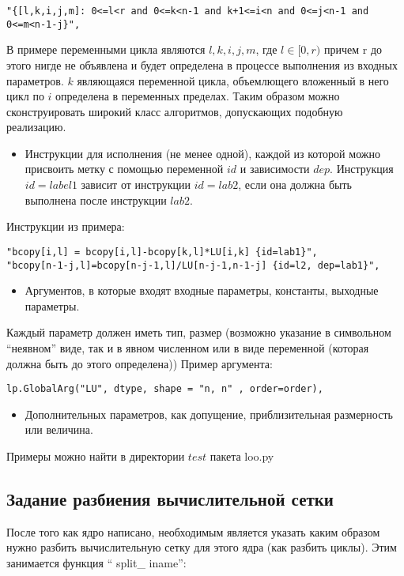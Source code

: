 \documentclass{scrartcl}
\begin{document}
\begin{verbatim}
"{[l,k,i,j,m]: 0<=l<r and 0<=k<n-1 and k+1<=i<n and 0<=j<n-1 and 0<=m<n-1-j}",
\end{verbatim}
В примере переменными цикла являются $l,k,i,j,m$, где $l \in [0,r)$ причем r до 
этого нигде не объявлена и будет определена в процессе выполнения из входных
параметров. $k$ являющаяся переменной цикла, объемлющего вложенный в него цикл по 
$i$ определена в переменных пределах. Таким образом можно сконструировать
широкий класс алгоритмов, допускающих подобную реализацию.
\begin{itemize}
\item Инструкции для исполнения (не менее одной), каждой из которой можно присвоить метку с помощью переменной $id$ и зависимости $dep$. Инструкция $id = label1$ зависит от инструкции $id = lab2$, если она должна быть выполнена после инструкции $lab2$.
\end{itemize}
Инструкции из примера:

\begin{verbatim}
"bcopy[i,l] = bcopy[i,l]-bcopy[k,l]*LU[i,k] {id=lab1}",
"bcopy[n-1-j,l]=bcopy[n-j-1,l]/LU[n-j-1,n-1-j] {id=l2, dep=lab1}",
\end{verbatim}

\begin{itemize}
\item Аргументов, в которые входят входные параметры, константы, выходные параметры.
\end{itemize}
Каждый параметр должен иметь тип, размер (возможно указание в символьном ``неявном''
виде, так и в явном численном или в виде переменной (которая должна быть до этого определена))
Пример аргумента:

\begin{verbatim}
lp.GlobalArg("LU", dtype, shape = "n, n" , order=order),
\end{verbatim}
\begin{itemize}
\item Дополнительных параметров, как допущение, приблизительная размерность или величина.
\end{itemize}
Примеры можно найти в директории $test$ пакета loo.py
\subsection{Задание разбиения вычислительной сетки}
\label{sec-7-5}

После того как ядро написано, необходимым является указать каким образом нужно 
разбить вычислительную сетку для этого ядра (как разбить циклы). Этим занимается 
функция `` split\_{} iname'':
\end{document}
